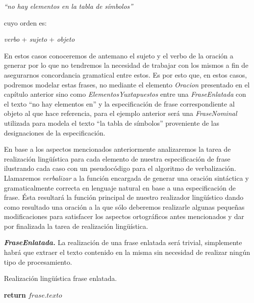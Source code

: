 \begin{center}
\emph{``no hay elementos en la tabla de símbolos''}
\end{center}

\noindent
cuyo orden es: 

\begin{center}
\emph{verbo} + \emph{sujeto} + \emph{objeto}
\end{center}


En estos casos conoceremos de antemano el sujeto y el verbo de la oración a generar por lo que no tendremos la necesidad de trabajar con los mismos a fin de asegurarnos concordancia gramatical entre estos. Es por esto que, en estos casos, podremos modelar estas frases, no mediante el elemento \emph{Oracion} presentado en el capítulo anterior sino como \emph{ElementosYuxtapuestos} entre una \emph{FraseEnlatada} con el texto ``no hay elementos en'' y la especificación de frase correspondiente al objeto al que hace referencia, para el ejemplo anterior será una \emph{FraseNominal} utilizada para modela el texto ``la tabla de símbolos'' proveniente de las designaciones de la especificación.


\bigskip
En base a los aspectos mencionados anteriormente analizaremos la tarea de realización lingüística para cada elemento de nuestra especificación de frase ilustrando cada caso con un pseudocódigo para el algoritmo de verbalización. Llamaremos \emph{verbalizar} a la función encargada de generar una oración sintáctica y gramaticalmente correcta en lenguaje natural en base a una especificación de frase. Ésta resultará la función principal de nuestro realizador lingüístico dando como resultado una oración a la que sólo deberemos realizarle algunas pequeñas modificaciones para satisfacer los aspectos ortográficos antes mencionados y dar por finalizada la tarea de realización lingüística.

\medskip
\noindent
\textbf{\emph{FraseEnlatada.}} La realización de una frase enlatada será trivial, simplemente habrá que extraer el texto contenido en la misma sin necesidad de realizar ningún tipo de procesamiento.

\begin{algorithm}[H]
\caption{Realización lingüística frase enlatada.}
\begin{algorithmic}[1]
\State \textbf{return} $frase.texto$
\EndFunction
\end{algorithmic}
\end{algorithm}


